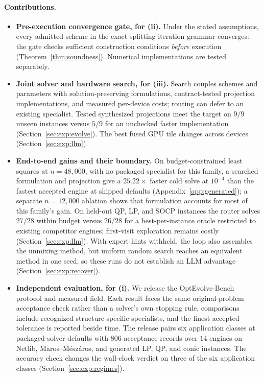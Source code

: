 \paragraph{Contributions.}
\begin{itemize}
\item \textbf{Pre-execution convergence gate, for (ii).} Under the stated assumptions, every admitted scheme in the exact splitting-iteration grammar converges: the gate checks sufficient construction conditions \emph{before} execution (Theorem~\ref{thm:soundness}). Numerical implementations are tested separately.
\item \textbf{Joint solver and hardware search, for (iii).} Search couples schemes and parameters with solution-preserving formulations, contract-tested projection implementations, and measured per-device costs; routing can defer to an existing specialist. Tested synthesized projections meet the target on $9/9$ unseen instances versus $5/9$ for an unchecked faster implementation (Section~\ref{sec:exp:evolve}). The best fused GPU tile changes across devices (Section~\ref{sec:exp:llm}).
\item \textbf{End-to-end gains and their boundary.} On budget-constrained least squares at $n=48{,}000$, with no packaged specialist for this family, a searched formulation and projection give a $25.22\times$ faster cold solve at $10^{-4}$ than the fastest accepted engine at shipped defaults (Appendix~\ref{app:generated}); a separate $n=12{,}000$ ablation shows that formulation accounts for most of this family's gain. On held-out QP, LP, and SOCP instances the router solves $27/28$ within budget versus $26/28$ for a best-per-instance oracle restricted to existing competitor engines; first-visit exploration remains costly (Section~\ref{sec:exp:llm}). With expert hints withheld, the loop also assembles the unmixing method, but uniform random search reaches an equivalent method in one seed, so these runs do not establish an LLM advantage (Section~\ref{sec:exp:recover}).
\item \textbf{Independent evaluation, for (i).} We release the OptEvolve-Bench protocol and measured field. Each result faces the same original-problem acceptance check rather than a solver's own stopping rule, comparisons include recognized structure-specific specialists, and the finest accepted tolerance is reported beside time. The release pairs six application classes at packaged-solver defaults with $806$ acceptance records over $14$ engines on Netlib, Maros--M\'esz\'aros, and generated LP, QP, and conic instances. The accuracy check changes the wall-clock verdict on three of the six application classes (Section~\ref{sec:exp:regimes}).
\end{itemize}
